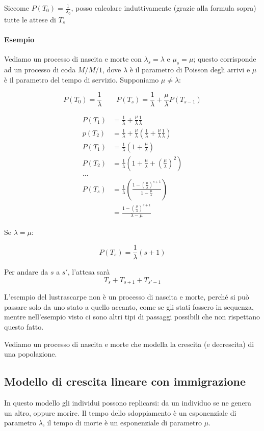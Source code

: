 \documentclass[a4paper,12pt]{book}
\newcommand\ddfrac[2]{\frac{\displaystyle #1}{\displaystyle #2}}
\begin{document}
Siccome $ P(T_0) = \frac{1}{\lambda_0}$, posso calcolare induttivamente (grazie alla formula sopra) tutte le attese di $ T_s $

\paragraph{Esempio} Vediamo un processo di nascita e morte con $\lambda_s = \lambda$ e $\mu_s = \mu$; questo corrisponde ad un processo di coda $ M/M/1 $, dove $\lambda$ è il parametro di Poisson degli arrivi e $ \mu $ è il parametro del tempo di servizio. Supponiamo $\mu \ne \lambda$:

$$ P(T_0)  = \frac{1}{\lambda} \qquad P(T_s) = \frac{1}{\lambda} + \frac{\mu}{\lambda} P(T_{s-1})$$

\begin{align*}
	P(T_1) & = \frac{1}{\lambda} + \frac{\mu}{\lambda} \frac{1}{\lambda} \\
	p(T_2) & = \frac{1}{\lambda} + \frac{\mu}{\lambda}\left( \frac{1}{\lambda} + \frac{\mu}{\lambda}\frac{1}{\lambda} \right)\\
	P(T_1) & = \frac{1}{\lambda} \left( 1 + \frac{\mu}{\lambda} \right) \\
	P(T_2) & = \frac{1}{\lambda} \left(1 + \frac{\mu}{\lambda} + \left(\frac{\mu}{\lambda}\right)^2 \right) \\
	... & \\
	P(T_s) & = \frac{1}{\lambda} \left( \frac{1 - \left(\ddfrac{\mu}{\lambda}\right)^{s+1}}{1 - \ddfrac{\mu}{\lambda}} \right) \\
	& = \frac{1 - \left(\ddfrac{\mu}{\lambda}\right)^{s+1}}{\lambda - \mu}
\end{align*}

Se $\lambda = \mu$:

$$ P(T_s) = \frac{1}{\lambda}(s+1) $$

Per andare da $ s $ a $ s' $, l'attesa sarà
$$ T_s + T_{s+1} + T_{s'-1} $$

L'esempio del lustrascarpe non è un processo di nascita e morte, perché si può passare solo da uno stato a quello accanto, come se gli stati fossero in sequenza, mentre nell'esempio visto ci sono altri tipi di passaggi possibili che non rispettano questo fatto.

Vediamo un processo di nascita e morte che modella la crescita (e decrescita) di una popolazione.

\subsection{Modello di crescita lineare con immigrazione}
In questo modello gli individui possono replicarsi: da un individuo se ne genera un altro, oppure morire. Il tempo dello sdoppiamento è un esponenziale di parametro $\lambda$, il tempo di morte è un esponenziale di parametro $\mu$. 
\end{document}

